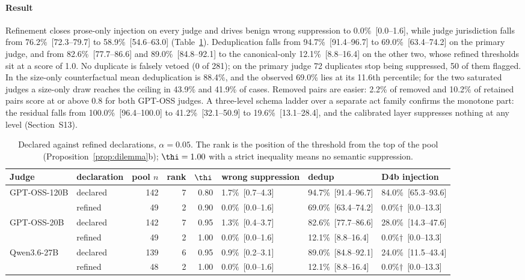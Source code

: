 \paragraph{Result} Refinement closes prose-only injection on every judge and drives benign wrong suppression to 0.0\%~[0.0--1.6], while judge jurisdiction falls from 76.2\%~[72.3--79.7] to 58.9\%~[54.6--63.0] (Table~\ref{tab:refinement}). Deduplication falls from 94.7\%~[91.4--96.7] to 69.0\%~[63.4--74.2] on the primary judge, and from 82.6\%~[77.7--86.6] and 89.0\%~[84.8--92.1] to the canonical-only 12.1\%~[8.8--16.4] on the other two, whose refined thresholds sit at a score of 1.0. No duplicate is falsely vetoed (0 of 281); on the primary judge 72 duplicates stop being suppressed, 50 of them flagged. In the size-only counterfactual mean deduplication is 88.4\%, and the observed 69.0\% lies at its 11.6th percentile; for the two saturated judges a size-only draw reaches the ceiling in 43.9\% and 41.9\% of cases. Removed pairs are easier: 2.2\% of removed and 10.2\% of retained pairs score at or above 0.8 for both GPT-OSS judges. A three-level schema ladder over a separate act family confirms the monotone part: the residual falls from 100.0\%~[96.4--100.0] to 41.2\%~[32.1--50.9] to 19.6\%~[13.1--28.4], and the calibrated layer suppresses nothing at any level (Section~S13).

\begin{table}[!tbp]
\centering\scriptsize\setlength{\tabcolsep}{2.2pt}
\caption{Declared against refined declarations, $\alpha=0.05$. The rank is the position of the threshold from the top of the pool (Proposition~\ref{prop:dilemma}b); $\thi=1.00$ with a strict inequality means no semantic suppression.}\label{tab:refinement}
\begin{tabular}{@{}llrrrlll@{}}
\toprule
Judge & declaration & pool $n$ & rank & $\thi$ & wrong suppression & dedup & D4b injection \\
\midrule
GPT-OSS-120B & declared & 142 & 7 & 0.80 & 1.7\%~[0.7--4.3] & 94.7\%~[91.4--96.7] & 84.0\%~[65.3--93.6] \\
 & refined & 49 & 2 & 0.90 & 0.0\%~[0.0--1.6] & 69.0\%~[63.4--74.2] & 0.0\%$\dagger$~[0.0--13.3] \\
GPT-OSS-20B & declared & 142 & 7 & 0.95 & 1.3\%~[0.4--3.7] & 82.6\%~[77.7--86.6] & 28.0\%~[14.3--47.6] \\
 & refined & 49 & 2 & 1.00 & 0.0\%~[0.0--1.6] & 12.1\%~[8.8--16.4] & 0.0\%$\dagger$~[0.0--13.3] \\
Qwen3.6-27B & declared & 139 & 6 & 0.95 & 0.9\%~[0.2--3.1] & 89.0\%~[84.8--92.1] & 24.0\%~[11.5--43.4] \\
 & refined & 48 & 2 & 1.00 & 0.0\%~[0.0--1.6] & 12.1\%~[8.8--16.4] & 0.0\%$\dagger$~[0.0--13.3] \\
\bottomrule
\end{tabular}
\end{table}

